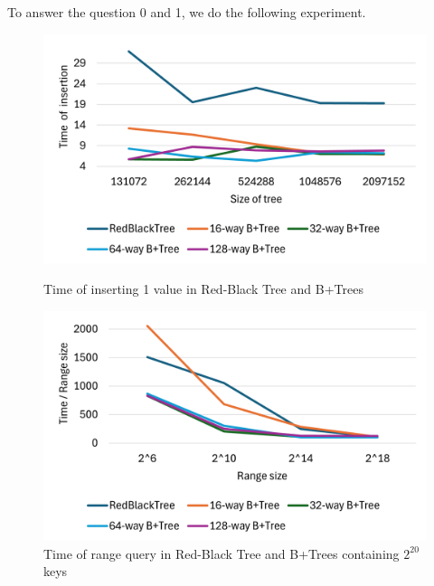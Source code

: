 \documentclass[twoside,11pt,openright]{report}
\theoremstyle{definition}
\begin{document}
To answer the question 0 and 1, we do the following experiment.

\newpage
{}
\begin{figure}[htbp]
  \centering
  \begin{minipage}[b]{0.49\textwidth}
    \centering
    \includegraphics[width=\textwidth]{asset/insert.png}
    \captionsetup{width=0.9\textwidth}
    \caption{Time of inserting 1 value in Red-Black Tree and B+Trees}
    \label{fig:insert_BPlusTree}
  \end{minipage}
  \begin{minipage}[b]{0.49\textwidth}
    \centering
    \includegraphics[width=\textwidth]{asset/range_query.png}
    \captionsetup{width=0.9\textwidth}
    \caption{Time of range query in Red-Black Tree and B+Trees containing $2^{20}$ keys}
    \label{fig:rq_BPlusTree}
  \end{minipage}

  \vspace{0.5cm}

\end{figure}
\restoregeometry
\end{document}
